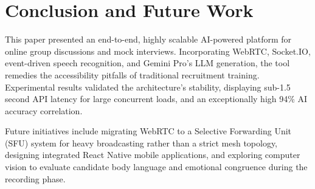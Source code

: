 \documentclass[conference]{IEEEtran}
\begin{document}
\section{Conclusion and Future Work}

This paper presented an end-to-end, highly scalable AI-powered platform for online group discussions and mock interviews. Incorporating WebRTC, Socket.IO, event-driven speech recognition, and Gemini Pro's LLM generation, the tool remedies the accessibility pitfalls of traditional recruitment training. Experimental results validated the architecture's stability, displaying sub-1.5 second API latency for large concurrent loads, and an exceptionally high 94\% AI accuracy correlation. 

Future initiatives include migrating WebRTC to a Selective Forwarding Unit (SFU) system for heavy broadcasting rather than a strict mesh topology, designing integrated React Native mobile applications, and exploring computer vision to evaluate candidate body language and emotional congruence during the recording phase.
\end{document}
